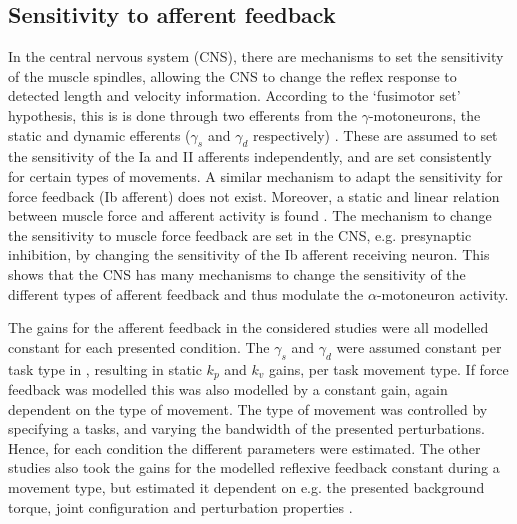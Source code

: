 \subsection{Sensitivity to afferent feedback}
In the central nervous system (CNS), there are mechanisms to set the sensitivity of the muscle spindles, allowing the CNS to change the reflex response to detected length and velocity information. According to the `fusimotor set' hypothesis, this is is done through two efferents from the $\gamma$-motoneurons, the static and dynamic efferents ($\gamma_s$ and $\gamma_d$ respectively) \cite{prochazka_fusimotor_1985}. These are assumed to set the sensitivity of the Ia and II afferents independently, and are set consistently for certain types of movements. A similar mechanism to adapt the sensitivity for force feedback (Ib afferent) does not exist. Moreover, a static and linear relation between muscle force and afferent activity is found \cite{crago_sampling_1982}. The mechanism to change the sensitivity to muscle force feedback are set in the CNS, e.g. presynaptic inhibition, by changing the sensitivity of the Ib afferent receiving neuron. This shows that the CNS has many mechanisms to change the sensitivity of the different types of afferent feedback and thus modulate the $\alpha$-motoneuron activity. 

The gains for the afferent feedback in the considered studies were all modelled constant for each presented condition. The $\gamma_s$ and $\gamma_d$ were assumed constant per task type in \cite{van_der_helm_identification_2002, schouten_nmclab_2008, mugge_rigorous_2010}, resulting in static $k_p$ and $k_v$ gains, per task movement type. If force feedback was modelled this was also modelled by a constant gain, again dependent on the type of movement. The type of movement was controlled by specifying a tasks, and varying the bandwidth of the presented perturbations. Hence, for each condition the different parameters were estimated. The other studies also took the gains for the modelled reflexive feedback constant during a movement type, but estimated it dependent on  e.g. the presented background torque, joint configuration and perturbation properties \cite{zhang_simultaneous_1997, mirbagheri_intrinsic_2000}. 



